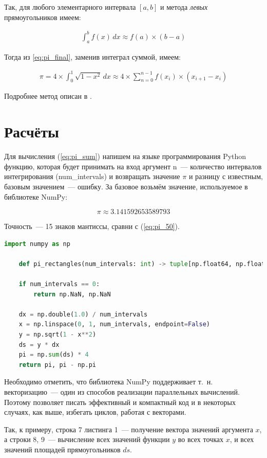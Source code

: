 \documentclass[a4paper,12pt]{article}
\begin{document}
Так, для любого элементарного интервала $[a,b]$ и метода \textit{левых} прямоугольников имеем:

\begin{align}\label{eq:rect_approx}
    \int_{a}^{b} f(x)\,dx \approx f(a)\times (b-a)
\end{align}

Тогда из \ref{eq:pi_final}, заменив интеграл суммой, имеем:

\begin{align}\label{eq:pi_sum}
    \pi = 4 \times \int_{0}^{1} \sqrt{1-x^2} \,dx \approx 4 \times \sum_{n = 0}^{n-1} f(x_i)\times(x_{i+1}-x_i)
\end{align}

Подробнее метод описан в \cite{rect}.

\section{Расчёты}

Для вычисления (\ref{eq:pi_sum}) напишем на языке программирования Python функцию, которая будет принимать на вход аргумент n~--- количество интервалов интегрирования (num\_intervals) и возвращать значение $\pi$ и разницу с известным, базовым значением~--- ошибку. За базовое возьмём значение, используемое в библиотеке NumPy:

$$\pi \approx 3.141592653589793$$

Точность~--- 15 знаков мантиссы, сравни с (\ref{eq:pi_50}).


\begin{lstlisting}[language=Python, caption=Функция вычисления $\pi$ и ошибки]
    import numpy as np
    
    def pi_rectangles(num_intervals: int) -> tuple[np.float64, np.float64]:

    if num_intervals == 0:
        return np.NaN, np.NaN
    
    dx = np.double(1.0) / num_intervals
    x = np.linspace(0, 1, num_intervals, endpoint=False)
    y = np.sqrt(1 - x**2)
    ds = y * dx
    pi = np.sum(ds) * 4
    return pi, pi - np.pi    
\end{lstlisting}    

Необходимо отметить, что библиотека NumPy поддерживает т.\ н. векторизацию~--- один из способов реализации параллельных вычислений. Поэтому позволяет писать эффективный и компактный код и в некоторых случаях, как выше, избегать циклов, работая с векторами.

Так, к примеру, строка 7 листинга 1~--- получение вектора значений аргумента $x$, а строки 8, 9~--- вычисление всех значений функции $y$ во всех точках $x$, и всех значений площадей прямоугольников $ds$.
\end{document}
